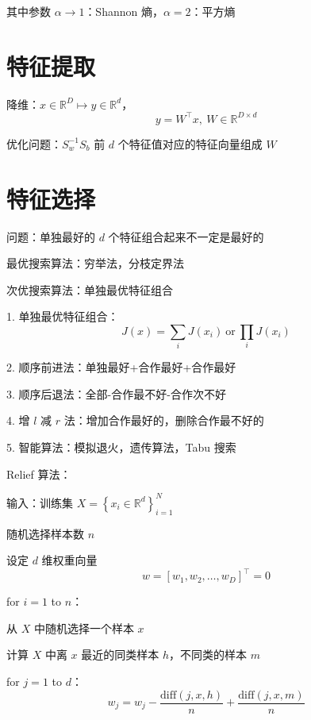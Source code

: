 \documentclass[openany]{ctexbook}
\theoremstyle{kaiti}
\theoremstyle{normal}
\begin{document}
其中参数 $\alpha \rightarrow 1$：Shannon 熵，$\alpha =2$：平方熵

\section{特征提取}

降维：$x\in \mathbb{R} ^D\mapsto y\in \mathbb{R} ^d$，
\begin{equation}
y=W^{\top}x,~W\in \mathbb{R} ^{D\times d}
\end{equation}

优化问题：$S_{w}^{-1}S_b$ 前 $d$ 个特征值对应的特征向量组成 $W$

\section{特征选择}

问题：单独最好的 $d$ 个特征组合起来不一定是最好的

最优搜索算法：穷举法，分枝定界法

次优搜索算法：单独最优特征组合

1. 单独最优特征组合：
\begin{equation}
  J(x)=\sum_iJ\left(x_i \right)~\mathrm{or}~ \prod_iJ\left(x_i \right)
\end{equation}

2. 顺序前进法：单独最好+合作最好+合作最好

3. 顺序后退法：全部-合作最不好-合作次不好

4. 增 $l$ 减 $r$ 法：增加合作最好的，删除合作最不好的

5. 智能算法：模拟退火，遗传算法，Tabu 搜索

Relief 算法：

输入：训练集 $X=\left\{ x_i\in \mathbb{R} ^d \right\}_{i=1}^{N}$ 

随机选择样本数 $n$

设定 $d$ 维权重向量 
\begin{equation}
w=[w_1,w_2,…,w_D]^{\top}=0
\end{equation}

for $i=1$ to $n$：

从 $X$ 中随机选择一个样本 $x$

计算 $X$ 中离 $x$ 最近的同类样本 $h$，不同类的样本 $m$

for $j=1$ to $d$：
\begin{equation}
w_j=w_j-\frac{\mathrm{diff}(j,x,h)}{n}+\frac{\mathrm{diff}(j,x,m)}{n}
\end{equation}
\end{document}
